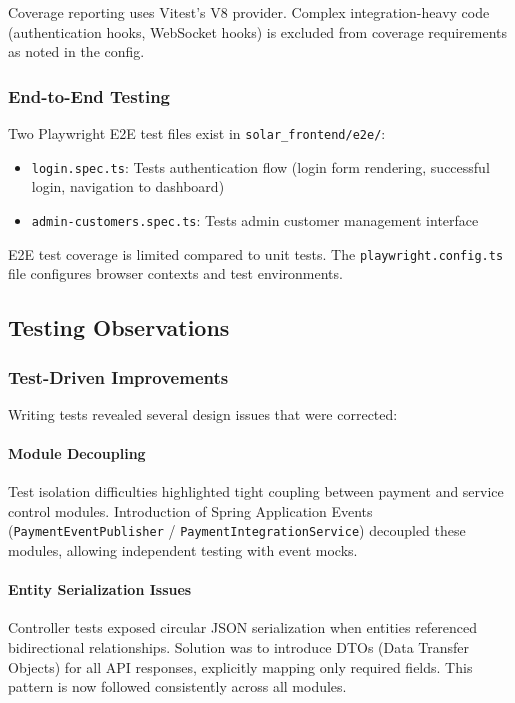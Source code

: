 Coverage reporting uses Vitest's V8 provider. Complex integration-heavy code (authentication hooks, WebSocket hooks) is excluded from coverage requirements as noted in the config.

\subsubsection{End-to-End Testing}
\label{subsubsec:e2e-testing}

Two Playwright E2E test files exist in \texttt{solar\_frontend/e2e/}:
\begin{itemize}
    \item \texttt{login.spec.ts}: Tests authentication flow (login form rendering, successful login, navigation to dashboard)
    \item \texttt{admin-customers.spec.ts}: Tests admin customer management interface
\end{itemize}

E2E test coverage is limited compared to unit tests. The \texttt{playwright.config.ts} file configures browser contexts and test environments.

\subsection{Testing Observations}
\label{subsec:lessons-learned}

\subsubsection{Test-Driven Improvements}
\label{subsubsec:testing-changes}

Writing tests revealed several design issues that were corrected:

\paragraph{Module Decoupling}
Test isolation difficulties highlighted tight coupling between payment and service control modules. Introduction of Spring Application Events (\texttt{PaymentEventPublisher} / \texttt{PaymentIntegrationService}) decoupled these modules, allowing independent testing with event mocks.

\paragraph{Entity Serialization Issues}
Controller tests exposed circular JSON serialization when entities referenced bidirectional relationships. Solution was to introduce DTOs (Data Transfer Objects) for all API responses, explicitly mapping only required fields. This pattern is now followed consistently across all modules.

